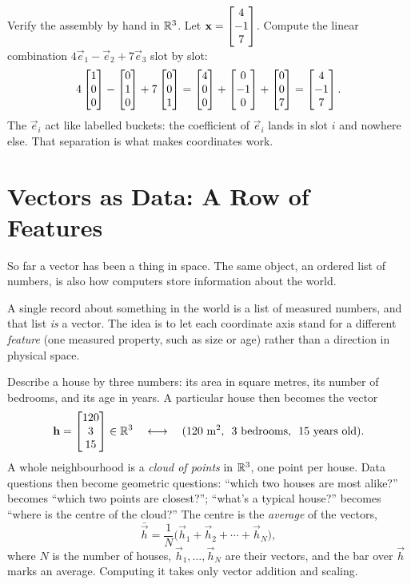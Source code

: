 \begin{labbox}
Verify the assembly by hand in $\mathbb{R}^3$. Let $\mathbf{x}=\begin{bmatrix}4\\-1\\7\end{bmatrix}$. Compute the linear
combination $4\vec{e}_1 - \vec{e}_2 + 7\vec{e}_3$ slot by slot:
\[
  4\begin{bmatrix}1\\0\\0\end{bmatrix} - \begin{bmatrix}0\\1\\0\end{bmatrix} + 7\begin{bmatrix}0\\0\\1\end{bmatrix}
  = \begin{bmatrix}4\\0\\0\end{bmatrix} + \begin{bmatrix}0\\-1\\0\end{bmatrix} + \begin{bmatrix}0\\0\\7\end{bmatrix}
  = \begin{bmatrix}4\\-1\\7\end{bmatrix}.
\]
The $\vec{e}_i$ act like labelled buckets: the coefficient of $\vec{e}_i$ lands in slot
$i$ and nowhere else. That separation is what makes coordinates work.
\end{labbox}

\section{Vectors as Data: A Row of Features}
\label{ch02:data}

So far a vector has been a thing in space. The same object, an ordered list of numbers,
is also how computers store information about the world.

A single record about something in the world is a list of measured numbers, and that list
\emph{is} a vector. The idea is to let each coordinate axis stand for a different
\emph{feature} (one measured property, such as size or age) rather than a direction in
physical space.

\begin{example}
\label{ch02:ex-house}
Describe a house by three numbers: its area in square metres, its number of bedrooms, and
its age in years. A particular house then becomes the vector
\[
  \mathbf{h} = \begin{bmatrix}120 \\ 3 \\ 15\end{bmatrix} \in \mathbb{R}^3
  \quad\longleftrightarrow\quad
  \text{(120 m\textsuperscript{2}, \ 3 bedrooms, \ 15 years old)}.
\]
A whole neighbourhood is a \emph{cloud of points} in $\mathbb{R}^3$, one point per house. Data
questions then become geometric questions: ``which two houses are most alike?'' becomes
``which two points are closest?''; ``what's a typical house?'' becomes ``where is the
centre of the cloud?'' The centre is the \emph{average} of the vectors,
\[
  \bar{\vec{h}} = \frac{1}{N}\bigl(\vec{h}_1 + \vec{h}_2 + \cdots + \vec{h}_N\bigr),
\]
where $N$ is the number of houses, $\vec{h}_1,\dots,\vec{h}_N$ are their vectors, and
the bar over $\vec{h}$ marks an average. Computing it takes only vector addition and
scaling.
\end{example}

